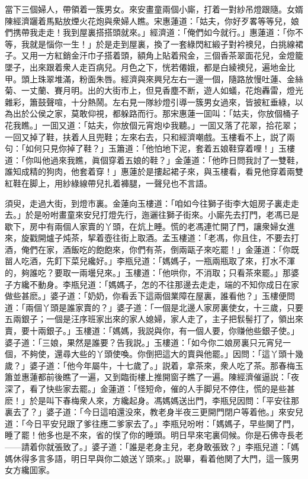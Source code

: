 當下三個婦人，帶領着一簇男女。來安畫童兩個小廝，打着一對紗吊燈跟隨。女婿陳經濟躧着馬點放煙火花炮與衆婦人瞧。宋惠蓮道：「姑夫，你好歹畧等等兒，娘們携帶我走走！我到屋裏搭搭頭就來。」經濟道：「俺們如今就行。」惠蓮道：「你不等，我就是惱你一生！」於是走到屋裏，換了一套綠閃紅緞子對衿襖兒，白挑線裙子。又用一方紅銷金汗巾子搭着頭，額角上貼着飛金，三個香茶翠面花兒，金燈籠墜子，出來跟着衆人走百病兒。月色之下，恍若僊娥，都是白綾襖兒，遍地金比甲。頭上珠翠堆滿，粉面朱唇。經濟與來興兒左右一邊一個，隨路放慢吐蓮、金絲菊、一丈蘭、賽月明。出的大街市上，但見香塵不断，遊人如蟻，花炮轟雷，燈光雜彩，簫鼓聲喧，十分熱鬧。左右見一隊紗燈引導一簇男女過來，皆披紅垂綠，以為出於公侯之家，莫敢仰視，都躲路而行。那宋惠蓮一囬叫：「姑夫，你放個桶子花我瞧。」一囬又道：「姑夫，你放個元宵炮ゆ我聽。」一囬又落了花翠，拾花翠；一回又掉了鞋，扶着人且兜鞋；左來右去，只和經濟嘲戲。玉樓看不上，説了兩句：「如何只見你掉了鞋？」玉簫道：「他怕地下泥，套着五娘鞋穿着哩！」玉樓道：「你叫他過來我瞧，眞個穿着五娘的鞋？」金蓮道：「他昨日問我討了一雙鞋，誰知成精的狗肉，他套着穿！」惠蓮於是摟起裙子來，與玉樓看，看見他穿着兩雙紅鞋在脚上，用紗綠線帶兒扎着褲腿，一聲兒也不言語。

須臾，走過大街，到燈市裏。金蓮向玉樓道：「咱如今往獅子街李大姐房子裏走走去。」於是吩咐畫童來安兒打燈先行，迤邐往獅子街來。小廝先去打門，老馮已是歇下，房中有兩個人家賣的丫頭，在炕上睡。慌的老馮連忙開了門，讓衆婦女進來，旋戳開爐子炖茶，挈着壺往街上取酒。孟玉樓道：「老馮，你且住，不要去打酒，俺們在家，酒飯吃的飽飽來，你們有茶，倒兩甌子來吃罷！」金蓮道：「你既㽞人吃酒，先飣下菜兒纔好。」李瓶兒道：「媽媽子，一瓶兩瓶取了來，打水不渾的，夠誰吃？要取一兩壜兒來。」玉樓道：「他哄你，不消取；只看茶來罷。」那婆子方纔不動身。李瓶兒道：「媽媽子，怎的不往那邊去走走，端的不知你成日在家做些甚麽。」婆子道：「奶奶，你看丢下這兩個業障在屋裏，誰看他？」玉樓便問道：「兩個丫頭是誰家賣的？」婆子道：「一個是北邊人家房裏使女，十三歲，只要五兩銀子；一個是汪序班家出來的家人媳婦，家人走了，主子把䯼髻打了，領出來賣，要十兩銀子。」玉樓道：「媽媽，我説與你，有一個人要，你赚他些銀子使。」婆子道：「三娘，果然是誰要？告我説。」玉樓道：「如今你二娘房裏只元宵兒一個，不夠使，還尋大些的丫頭使喚。你倒把這大的賣與他罷。」因問：「這丫頭十幾歲？」婆子道：「他今年屬牛，十七歲了。」説着，拿茶來，衆人吃了茶。那春梅玉簫並惠蓮都前後瞧了一遍，又到臨街樓上推開窗子瞧了一遍。陳經濟催逼説：「夜深了，看了快些家去罷。」金蓮道：「怪短命，催的人手脚兒不停住，慌的是些甚麽！」於是叫下春梅衆人來，方纔起身。馮媽媽送出門，李瓶兒因問：「平安往那裏去了？」婆子道：「今日這咱還没來，教老身半夜三更開門閉户等着他。」來安兒道：「今日平安兒跟了爹往應二爹家去了。」李瓶兒吩咐：「媽媽子，早些関了門，睡了罷！他多也是不來，省的悮了你的睡頭。明日早來宅裏伺候。你是石佛寺長老——請着你就張致了。」婆子道：「誰是老身主兒，老身敢張致？」李瓶兒道：「媽媽休得多言多語，明日早與你二娘送丫頭來。」説畢，看着他関了大門，這一簇男女方纔囬家。


